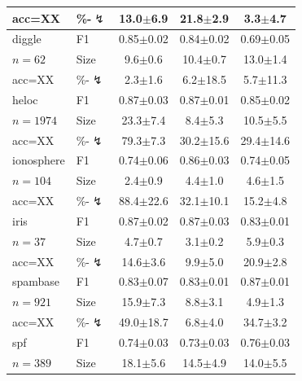 \begin{tabular}{llccc}
acc=XX & \%-$\lightning$ & 13.0{\scriptsize$\pm$6.9} & 21.8{\scriptsize$\pm$2.9} & 3.3{\scriptsize$\pm$4.7} \\
\midrule
diggle & F1 & 0.85{\scriptsize$\pm$0.02} & 0.84{\scriptsize$\pm$0.02} & 0.69{\scriptsize$\pm$0.05} \\
$n=62$ & Size & 9.6{\scriptsize$\pm$0.6} & 10.4{\scriptsize$\pm$0.7} & 13.0{\scriptsize$\pm$1.4} \\
acc=XX & \%-$\lightning$ & 2.3{\scriptsize$\pm$1.6} & 6.2{\scriptsize$\pm$18.5} & 5.7{\scriptsize$\pm$11.3} \\
\midrule
heloc & F1 & 0.87{\scriptsize$\pm$0.03} & 0.87{\scriptsize$\pm$0.01} & 0.85{\scriptsize$\pm$0.02} \\
$n=1974$ & Size & 23.3{\scriptsize$\pm$7.4} & 8.4{\scriptsize$\pm$5.3} & 10.5{\scriptsize$\pm$5.5} \\
acc=XX & \%-$\lightning$ & 79.3{\scriptsize$\pm$7.3} & 30.2{\scriptsize$\pm$15.6} & 29.4{\scriptsize$\pm$14.6} \\
\midrule
ionosphere & F1 & 0.74{\scriptsize$\pm$0.06} & 0.86{\scriptsize$\pm$0.03} & 0.74{\scriptsize$\pm$0.05} \\
$n=104$ & Size & 2.4{\scriptsize$\pm$0.9} & 4.4{\scriptsize$\pm$1.0} & 4.6{\scriptsize$\pm$1.5} \\
acc=XX & \%-$\lightning$ & 88.4{\scriptsize$\pm$22.6} & 32.1{\scriptsize$\pm$10.1} & 15.2{\scriptsize$\pm$4.8} \\
\midrule
iris & F1 & 0.87{\scriptsize$\pm$0.02} & 0.87{\scriptsize$\pm$0.03} & 0.83{\scriptsize$\pm$0.01} \\
$n=37$ & Size & 4.7{\scriptsize$\pm$0.7} & 3.1{\scriptsize$\pm$0.2} & 5.9{\scriptsize$\pm$0.3} \\
acc=XX & \%-$\lightning$ & 14.6{\scriptsize$\pm$3.6} & 9.9{\scriptsize$\pm$5.0} & 20.9{\scriptsize$\pm$2.8} \\
\midrule
spambase & F1 & 0.83{\scriptsize$\pm$0.07} & 0.83{\scriptsize$\pm$0.01} & 0.87{\scriptsize$\pm$0.01} \\
$n=921$ & Size & 15.9{\scriptsize$\pm$7.3} & 8.8{\scriptsize$\pm$3.1} & 4.9{\scriptsize$\pm$1.3} \\
acc=XX & \%-$\lightning$ & 49.0{\scriptsize$\pm$18.7} & 6.8{\scriptsize$\pm$4.0} & 34.7{\scriptsize$\pm$3.2} \\
\midrule
spf & F1 & 0.74{\scriptsize$\pm$0.03} & 0.73{\scriptsize$\pm$0.03} & 0.76{\scriptsize$\pm$0.03} \\
$n=389$ & Size & 18.1{\scriptsize$\pm$5.6} & 14.5{\scriptsize$\pm$4.9} & 14.0{\scriptsize$\pm$5.5} \\

\end{tabular}
